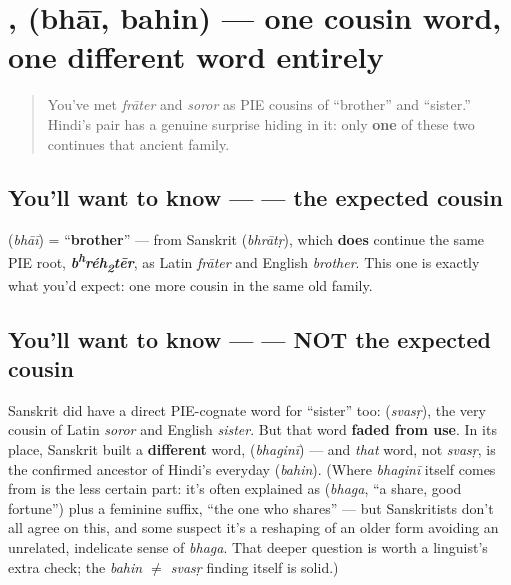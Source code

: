 \section[\texorpdfstring{\hi{भाई} \hi{बहन} (bhāī bahin)}{भाई बहन (bhāī bahin)}]{,  (bhāī, bahin) — one cousin word, one different word entirely}

\label{lesson:HI-C12-bhaai-bahin}



\begin{quote}
You've met \emph{frāter} and \emph{soror} as PIE cousins of \textquotedblleft{}brother\textquotedblright{} and \textquotedblleft{}sister.\textquotedblright{} Hindi's pair has a genuine surprise hiding in it: only \textbf{one} of these two continues that ancient family.
\end{quote}

\subsection*{You'll want to know —  — the expected cousin}
\textbf{} (\emph{bhāī}) = \textquotedblleft{}\textbf{brother}\textquotedblright{} — from Sanskrit \textbf{} (\emph{bhrātṛ}), which \textbf{does} continue the same PIE root, \emph{\textbf{b\textsuperscript{h}réh\textsubscript{2}tēr}}, as Latin \emph{frāter} and English \emph{brother}. This one is exactly what you'd expect: one more cousin in the same old family.

\subsection*{You'll want to know —  — NOT the expected cousin}
Sanskrit did have a direct PIE-cognate word for \textquotedblleft{}sister\textquotedblright{} too: \textbf{} (\emph{svasṛ}), the very cousin of Latin \emph{soror} and English \emph{sister}. But that word \textbf{faded from use}. In its place, Sanskrit built a \textbf{different} word, \textbf{} (\emph{bhaginī}) — and \emph{that} word, not \emph{svasṛ}, is the confirmed ancestor of Hindi's everyday \textbf{} (\emph{bahin}). (Where \emph{bhaginī} itself comes from is the less certain part: it's often explained as \textbf{} (\emph{bhaga}, \textquotedblleft{}a share, good fortune\textquotedblright{}) plus a feminine suffix, \textquotedblleft{}the one who shares\textquotedblright{} — but Sanskritists don't all agree on this, and some suspect it's a reshaping of an older form avoiding an unrelated, indelicate sense of \emph{bhaga}. That deeper question is worth a linguist's extra check; the \emph{bahin $\neq$ svasṛ} finding itself is solid.)

